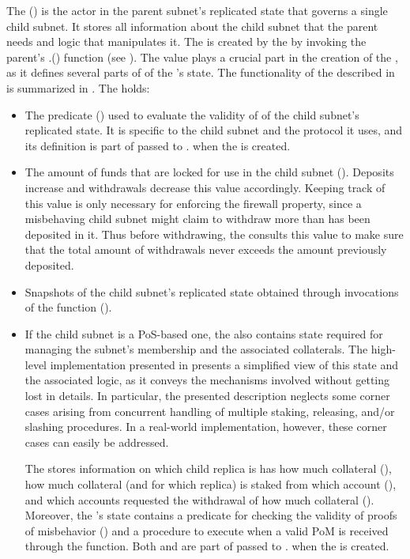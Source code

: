 The \saFull (\sa) is the actor in the parent subnet's replicated state that governs a single child subnet.
It stores all information about the child subnet that the parent needs and logic that manipulates it.
The \sa is created by the \gw by invoking the parent's \gw.() function (see ).
The  value plays a crucial part in the creation of the \sa, as it defines several parts of of the \sa's state.
The functionality of the \sa described in  is summarized in .
The \sa holds:
\begin{itemize}
    
    \item The predicate () used to evaluate the validity of \pofsFull of the child subnet's replicated state.
    It is specific to the child subnet and the protocol it uses, and its definition is part of  passed to \gw. when the \sa is created.

    \item The amount of funds that are locked for use in the child subnet ().
    Deposits increase and withdrawals decrease this value accordingly.
    Keeping track of this value is only necessary for enforcing the firewall property, since a misbehaving child subnet might claim to withdraw more than has been deposited in it.
    Thus before withdrawing, the \sa consults this value to make sure that the total amount of withdrawals never exceeds the amount previously deposited.

    \item Snapshots of the child subnet's replicated state obtained through invocations of the  function ().

    \item If the child subnet is a PoS-based one, the \sa also contains state required for managing the subnet's membership and the associated collaterals.
    The high-level implementation presented in  presents a simplified view of this state and the associated logic, as it conveys the mechanisms involved without getting lost in details.
    In particular, the presented description neglects some corner cases arising from concurrent handling of multiple staking, releasing, and/or slashing procedures.
    In a real-world implementation, however, these corner cases can easily be addressed.

    The \sa stores information on which child replica is has how much collateral (),
    how much collateral (and for which replica) is staked from which account (),
    and which accounts requested the withdrawal of how much collateral ().
    Moreover, the \sa's state contains a predicate for checking the validity of proofs of misbehavior ()
    and a procedure to execute when a valid PoM is received through the  function.
    Both  and  are part of  passed to \gw. when the \sa is created.
    
\end{itemize}


